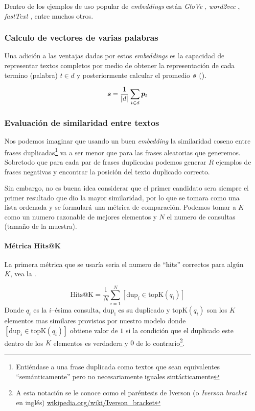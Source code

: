 Dentro de los ejemplos de uso popular de \textit{embeddings} están \emph{GloVe} \cite{pennington2014glove}, \emph{word2vec} \cite{Mikolov2014}, \emph{fastText} \cite{joulin2016fasttext}, entre muchos otros.

\subsubsection{Calculo de vectores de varias palabras}
Una adición a las ventajas dadas por estos \emph{embeddings} es la capacidad de representar textos completos por medio de obtener la representación de cada termino (palabra) $t \in d$ y posteriormente calcular el promedio ${\bm{s}}$ ().

\begin{equation} \label{eq:embeddings-sum}
  {\bm{s}} = \frac{1}{|d|} \sum_{t \in d} {\bm{p}}_{t}
\end{equation}

\subsubsection{Evaluación de similaridad entre textos}
Nos podemos imaginar que usando un buen \emph{embedding} la similaridad coseno entre frases duplicadas\footnote{Entiéndase a una frase duplicada como textos que sean equivalentes ``semánticamente'' pero no necesariamente iguales sintácticamente} va a ser menor que para las frases aleatorias que generemos. Sobretodo que para cada par de frases duplicadas podemos generar $R$ ejemplos de frases negativas y encontrar la posición del texto duplicado correcto.

Sin embargo, no es buena idea considerar que el primer candidato sera siempre el primer resultado que dio la mayor similaridad, por lo que se tomara como una lista ordenada y se formulará una métrica de comparación. Podemos tomar a $K$ como un numero razonable de mejores elementos y $N$ el numero de consultas (tamaño de la muestra).

\paragraph{Métrica Hits@K}
La primera métrica que se usaría seria el numero de ``hits'' correctos para algún $K$, vea la .

\begin{equation} \label{eq:hits-k}
  \mathrm{Hits@K} = \frac{1}{N} \sum_{i=1}^{N} [\mathrm{dup}_i \in \mathrm{topK}(q_i)]
\end{equation}
Donde $q_i$ es la $i$--\'esima consulta, $\mathrm{dup_i}$ es su duplicado y $\mathrm{topK}(q_i)$ son los $K$ elementos mas similares provistos por nuestro modelo donde $[\mathrm{dup}_i \in \mathrm{topK}(q_i)]$ obtiene valor de $1$ si la condición que el duplicado este dentro de los $K$ elementos es verdadera y $0$ de lo contrario\footnote{A esta notación se le conoce como el paréntesis de Iverson (o \textsl{Iverson bracket} en inglés) \href{https://en.wikipedia.org/wiki/Iverson\_bracket}{wikipedia.org/wiki/Iverson\_bracket}}.

